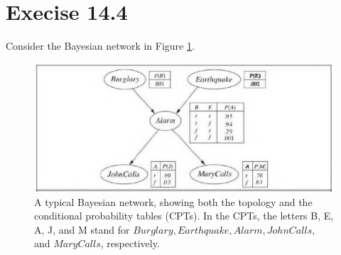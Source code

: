 \documentclass{article}
\begin{document}
\section{Execise 14.4}
Consider the Bayesian network in Figure \ref{fig:1}.
\begin{figure}[ht]
  \centering
  \includegraphics[width=.7\textwidth]{fig14_2.jpg}
  \caption{A typical Bayesian network, showing both the topology and
    the conditional probability tables (CPTs). In the CPTs, the
    letters B, E, A, J, and M stand for $Burglary, Earthquake,
    Alarm, John Calls,$ and $MaryCalls$, respectively. 
  }
  \label{fig:1}
\end{figure}
\end{document}
